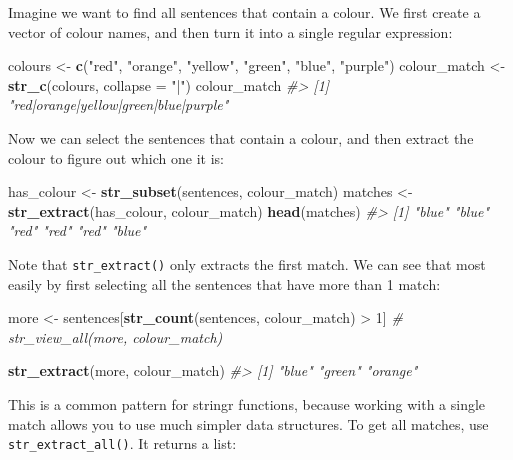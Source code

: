 \documentclass[]{book}
\newenvironment{Shaded}{\begin{snugshade}}{\end{snugshade}}
\newcommand{\KeywordTok}[1]{\textcolor[rgb]{0.13,0.29,0.53}{\textbf{{#1}}}}
\newcommand{\DataTypeTok}[1]{\textcolor[rgb]{0.13,0.29,0.53}{{#1}}}
\newcommand{\DecValTok}[1]{\textcolor[rgb]{0.00,0.00,0.81}{{#1}}}
\newcommand{\StringTok}[1]{\textcolor[rgb]{0.31,0.60,0.02}{{#1}}}
\newcommand{\CommentTok}[1]{\textcolor[rgb]{0.56,0.35,0.01}{\textit{{#1}}}}
\newcommand{\NormalTok}[1]{{#1}}
\begin{document}
Imagine we want to find all sentences that contain a colour. We first
create a vector of colour names, and then turn it into a single regular
expression:

\begin{Shaded}
\begin{Highlighting}[]
\NormalTok{colours <-}\StringTok{ }\KeywordTok{c}\NormalTok{(}\StringTok{"red"}\NormalTok{, }\StringTok{"orange"}\NormalTok{, }\StringTok{"yellow"}\NormalTok{, }\StringTok{"green"}\NormalTok{, }\StringTok{"blue"}\NormalTok{, }\StringTok{"purple"}\NormalTok{)}
\NormalTok{colour_match <-}\StringTok{ }\KeywordTok{str_c}\NormalTok{(colours, }\DataTypeTok{collapse =} \StringTok{"|"}\NormalTok{)}
\NormalTok{colour_match}
\CommentTok{#> [1] "red|orange|yellow|green|blue|purple"}
\end{Highlighting}
\end{Shaded}

Now we can select the sentences that contain a colour, and then extract
the colour to figure out which one it is:

\begin{Shaded}
\begin{Highlighting}[]
\NormalTok{has_colour <-}\StringTok{ }\KeywordTok{str_subset}\NormalTok{(sentences, colour_match)}
\NormalTok{matches <-}\StringTok{ }\KeywordTok{str_extract}\NormalTok{(has_colour, colour_match)}
\KeywordTok{head}\NormalTok{(matches)}
\CommentTok{#> [1] "blue" "blue" "red"  "red"  "red"  "blue"}
\end{Highlighting}
\end{Shaded}

Note that \texttt{str\_extract()} only extracts the first match. We can
see that most easily by first selecting all the sentences that have more
than 1 match:

\begin{Shaded}
\begin{Highlighting}[]
\NormalTok{more <-}\StringTok{ }\NormalTok{sentences[}\KeywordTok{str_count}\NormalTok{(sentences, colour_match) >}\StringTok{ }\DecValTok{1}\NormalTok{]}
\CommentTok{# str_view_all(more, colour_match)}

\KeywordTok{str_extract}\NormalTok{(more, colour_match)}
\CommentTok{#> [1] "blue"   "green"  "orange"}
\end{Highlighting}
\end{Shaded}

This is a common pattern for stringr functions, because working with a
single match allows you to use much simpler data structures. To get all
matches, use \texttt{str\_extract\_all()}. It returns a list:
\end{document}
